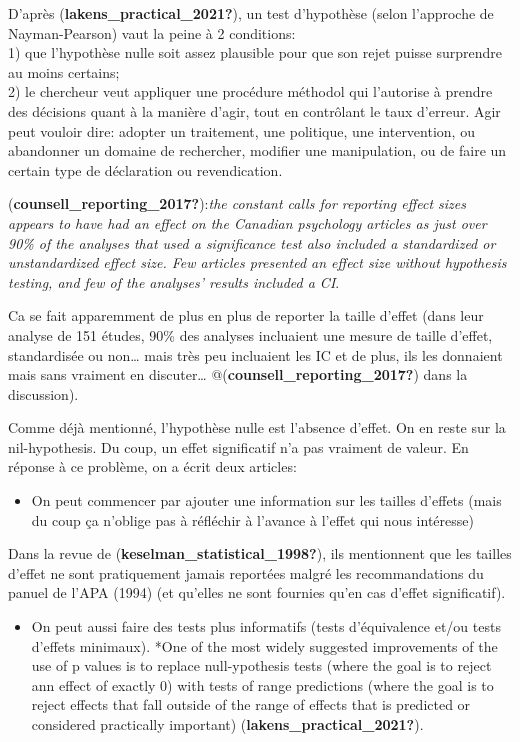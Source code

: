 \documentclass[
  english,
  man]{apa6}
\providecommand{\tightlist}{%
  \setlength{\itemsep}{0pt}\setlength{\parskip}{0pt}}
\begin{document}
D'après (\textbf{lakens\_practical\_2021?}), un test d'hypothèse (selon l'approche de Nayman-Pearson) vaut la peine à 2 conditions:\\
1) que l'hypothèse nulle soit assez plausible pour que son rejet puisse surprendre au moins certains;\\
2) le chercheur veut appliquer une procédure méthodol qui l'autorise à prendre des décisions quant à la manière d'agir, tout en contrôlant le taux d'erreur. Agir peut vouloir dire: adopter un traitement, une politique, une intervention, ou abandonner un domaine de rechercher, modifier une manipulation, ou de faire un certain type de déclaration ou revendication.

(\textbf{counsell\_reporting\_2017?}):\emph{the constant calls for reporting effect sizes appears to have had an effect on the Canadian psychology articles as just over 90\% of the analyses that used a significance test also included a standardized or unstandardized effect size. Few articles presented an effect size without hypothesis testing, and few of the analyses' results included a CI}.

Ca se fait apparemment de plus en plus de reporter la taille d'effet (dans leur analyse de 151 études, 90\% des analyses incluaient une mesure de taille d'effet, standardisée ou non\ldots{} mais très peu incluaient les IC et de plus, ils les donnaient mais sans vraiment en discuter\ldots{} @(\textbf{counsell\_reporting\_2017?}) dans la discussion).

Comme déjà mentionné, l'hypothèse nulle est l'absence d'effet. On en reste sur la nil-hypothesis. Du coup, un effet significatif n'a pas vraiment de valeur. En réponse à ce problème, on a écrit deux articles:

\begin{itemize}
\tightlist
\item
  On peut commencer par ajouter une information sur les tailles d'effets (mais du coup ça n'oblige pas à réfléchir à l'avance à l'effet qui nous intéresse)
\end{itemize}

Dans la revue de (\textbf{keselman\_statistical\_1998?}), ils mentionnent que les tailles d'effet ne sont pratiquement jamais reportées malgré les recommandations du panuel de l'APA (1994) (et qu'elles ne sont fournies qu'en cas d'effet significatif).

\begin{itemize}
\tightlist
\item
  On peut aussi faire des tests plus informatifs (tests d'équivalence et/ou tests d'effets minimaux). *One of the most widely suggested improvements of the use of p values is to replace null-ypothesis tests (where the goal is to reject ann effect of exactly 0) with tests of range predictions (where the goal is to reject effects that fall outside of the range of effects that is predicted or considered practically important) (\textbf{lakens\_practical\_2021?}).
\end{itemize}
\end{document}
